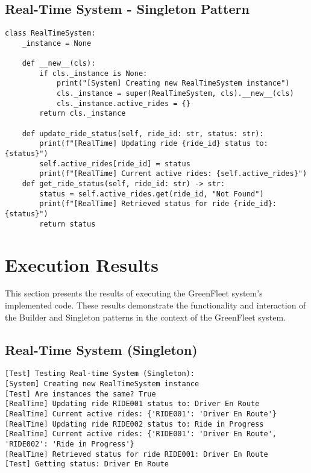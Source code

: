 \documentclass[12pt]{article}
\begin{document}
\subsection{Real-Time System - Singleton Pattern}
\begin{lstlisting}[caption=RealTimeSystem Singleton Implementation]
class RealTimeSystem:
    _instance = None
    
    def __new__(cls):
        if cls._instance is None:
            print("[System] Creating new RealTimeSystem instance")
            cls._instance = super(RealTimeSystem, cls).__new__(cls)
            cls._instance.active_rides = {}
        return cls._instance
    
    def update_ride_status(self, ride_id: str, status: str):
        print(f"[RealTime] Updating ride {ride_id} status to: {status}")
        self.active_rides[ride_id] = status
        print(f"[RealTime] Current active rides: {self.active_rides}")
    def get_ride_status(self, ride_id: str) -> str:
        status = self.active_rides.get(ride_id, "Not Found")
        print(f"[RealTime] Retrieved status for ride {ride_id}: {status}")
        return status
\end{lstlisting}

\section{Execution Results}

This section presents the results of executing the GreenFleet system's implemented code. These results demonstrate the functionality and interaction of the Builder and Singleton patterns in the context of the GreenFleet system.

\subsection{Real-Time System (Singleton)}
\begin{verbatim}
[Test] Testing Real-time System (Singleton):
[System] Creating new RealTimeSystem instance
[Test] Are instances the same? True
[RealTime] Updating ride RIDE001 status to: Driver En Route
[RealTime] Current active rides: {'RIDE001': 'Driver En Route'}
[RealTime] Updating ride RIDE002 status to: Ride in Progress
[RealTime] Current active rides: {'RIDE001': 'Driver En Route', 'RIDE002': 'Ride in Progress'}
[RealTime] Retrieved status for ride RIDE001: Driver En Route
[Test] Getting status: Driver En Route
\end{verbatim}
\end{document}
